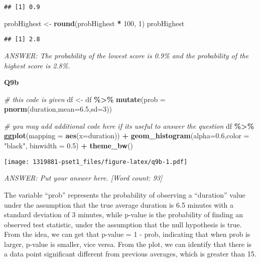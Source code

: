 \documentclass[
]{article}
\newenvironment{Shaded}{\begin{snugshade}}{\end{snugshade}}
\newcommand{\AttributeTok}[1]{\textcolor[rgb]{0.13,0.29,0.53}{#1}}
\newcommand{\CommentTok}[1]{\textcolor[rgb]{0.56,0.35,0.01}{\textit{#1}}}
\newcommand{\DecValTok}[1]{\textcolor[rgb]{0.00,0.00,0.81}{#1}}
\newcommand{\FloatTok}[1]{\textcolor[rgb]{0.00,0.00,0.81}{#1}}
\newcommand{\FunctionTok}[1]{\textcolor[rgb]{0.13,0.29,0.53}{\textbf{#1}}}
\newcommand{\NormalTok}[1]{#1}
\newcommand{\OtherTok}[1]{\textcolor[rgb]{0.56,0.35,0.01}{#1}}
\newcommand{\SpecialCharTok}[1]{\textcolor[rgb]{0.81,0.36,0.00}{\textbf{#1}}}
\newcommand{\StringTok}[1]{\textcolor[rgb]{0.31,0.60,0.02}{#1}}
\begin{document}
\begin{verbatim}
## [1] 0.9
\end{verbatim}

\begin{Shaded}
\begin{Highlighting}[]
\NormalTok{probHighest }\OtherTok{\textless{}{-}} \FunctionTok{round}\NormalTok{(probHighest }\SpecialCharTok{*} \DecValTok{100}\NormalTok{, }\DecValTok{1}\NormalTok{)}
\NormalTok{probHighest}
\end{Highlighting}
\end{Shaded}

\begin{verbatim}
## [1] 2.8
\end{verbatim}

\emph{ANSWER: The probability of the lowest score is 0.9\% and the
probability of the highest score is 2.8\%.}

\textbf{Q9b}

\begin{Shaded}
\begin{Highlighting}[]
\CommentTok{\# this code is given}
\NormalTok{df }\OtherTok{\textless{}{-}}\NormalTok{ df }\SpecialCharTok{\%\textgreater{}\%}
  \FunctionTok{mutate}\NormalTok{(}\AttributeTok{prob =} \FunctionTok{pnorm}\NormalTok{(duration,}\AttributeTok{mean=}\FloatTok{6.5}\NormalTok{,}\AttributeTok{sd=}\DecValTok{3}\NormalTok{))}

\CommentTok{\# you may add additional code here if it\textquotesingle{}s useful to answer the question}
\NormalTok{df }\SpecialCharTok{\%\textgreater{}\%}
  \FunctionTok{ggplot}\NormalTok{(}\AttributeTok{mapping =} \FunctionTok{aes}\NormalTok{(}\AttributeTok{x=}\NormalTok{duration)) }\SpecialCharTok{+}
  \FunctionTok{geom\_histogram}\NormalTok{(}\AttributeTok{alpha=}\FloatTok{0.6}\NormalTok{,}\AttributeTok{color =} \StringTok{"black"}\NormalTok{, }\AttributeTok{binwidth =} \FloatTok{0.5}\NormalTok{) }\SpecialCharTok{+}
  \FunctionTok{theme\_bw}\NormalTok{()}
\end{Highlighting}
\end{Shaded}

\texttt{[image: 1319881-pset1\_files/figure-latex/q9b-1.pdf]}

\emph{ANSWER: Put your answer here. {[}Word count: 93{]}}

The variable ``prob'' represents the probability of observing a
``duration'' value under the assumption that the true average duration
is 6.5 minutes with a standard deviation of 3 minutes, while p-value is
the probability of finding an observed test statistic, under the
assumption that the null hypothesis is true. From the idea, we can get
that p-value = 1 - prob, indicating that when prob is larger, p-value is
smaller, vice versa. From the plot, we can identify that there is a data
point significant different from previous averages, which is greater
than 15.
\end{document}
